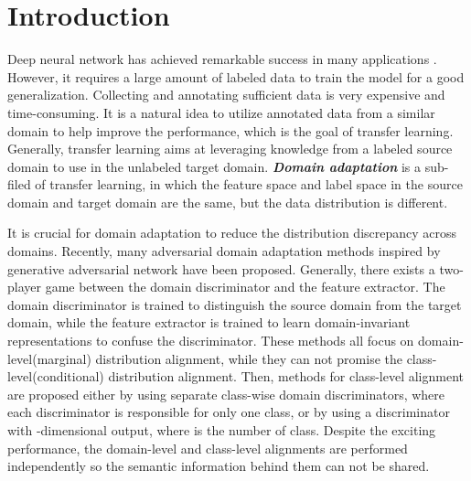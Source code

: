 \documentclass{ecai}
\begin{document}
\section{Introduction}

Deep neural network has achieved remarkable success in many applications \cite{b1}. However, it requires a large amount of labeled data to train the model for a good generalization. Collecting and annotating sufficient data is very expensive and time-consuming. It is a natural idea to utilize annotated data from a similar domain to help improve the performance, which is the goal of transfer learning. Generally, transfer learning aims at leveraging knowledge from a labeled source domain to use in the unlabeled target domain\cite{b2}. \textbf{{\emph{Domain adaptation}}} is a sub-filed of transfer learning, in which the feature space and label space in the source domain and target domain are the same, but the data distribution is different\cite{b2}.


It is crucial for domain adaptation to reduce the distribution discrepancy across domains\cite{b4,b5}.
Recently, many adversarial domain adaptation methods inspired by generative adversarial network\cite{b12} have been proposed. Generally, there exists a two-player game between the domain discriminator and the feature extractor\cite{b18,b33,b24,b37}. The domain discriminator is trained to distinguish the source domain from the target domain, while the feature extractor is trained to learn domain-invariant representations to confuse the discriminator. These methods all focus on domain-level(marginal) distribution alignment, while they can not promise the class-level(conditional) distribution alignment. Then, methods for class-level alignment are proposed either by using separate class-wise domain discriminators, where each discriminator is responsible for only one class\cite{b13}, or by using a discriminator with -dimensional output, where  is the number of class\cite{b14}.  Despite the exciting performance, the domain-level and class-level alignments are performed independently so the semantic information behind them can not be shared.


\setlength{\abovecaptionskip}{-0.4cm}  \setlength{\belowcaptionskip}{-0.1cm}   
\end{document}
